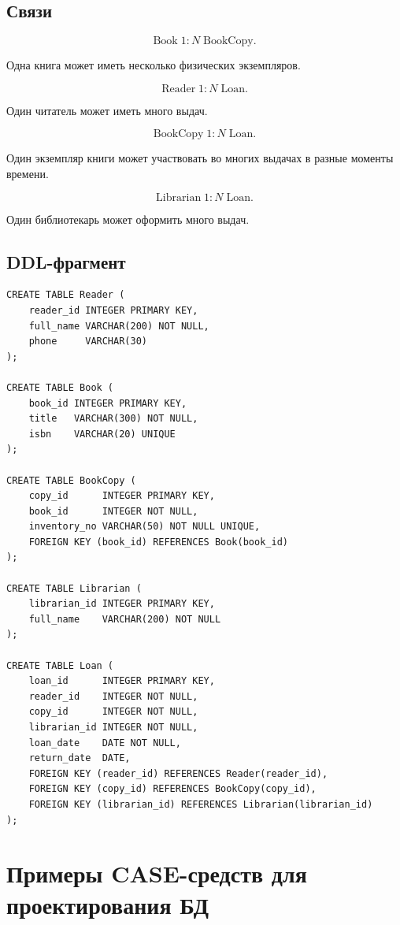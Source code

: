 \documentclass[12pt,a4paper]{article}
\theoremstyle{remark}
\begin{document}
\subsection{Связи}

\[
    \text{Book} \; 1 : N \; \text{BookCopy}.
\]

Одна книга может иметь несколько физических экземпляров.

\[
    \text{Reader} \; 1 : N \; \text{Loan}.
\]

Один читатель может иметь много выдач.

\[
    \text{BookCopy} \; 1 : N \; \text{Loan}.
\]

Один экземпляр книги может участвовать во многих выдачах в разные моменты времени.

\[
    \text{Librarian} \; 1 : N \; \text{Loan}.
\]

Один библиотекарь может оформить много выдач.

\subsection{DDL-фрагмент}

\begin{verbatim}
CREATE TABLE Reader (
    reader_id INTEGER PRIMARY KEY,
    full_name VARCHAR(200) NOT NULL,
    phone     VARCHAR(30)
);

CREATE TABLE Book (
    book_id INTEGER PRIMARY KEY,
    title   VARCHAR(300) NOT NULL,
    isbn    VARCHAR(20) UNIQUE
);

CREATE TABLE BookCopy (
    copy_id      INTEGER PRIMARY KEY,
    book_id      INTEGER NOT NULL,
    inventory_no VARCHAR(50) NOT NULL UNIQUE,
    FOREIGN KEY (book_id) REFERENCES Book(book_id)
);

CREATE TABLE Librarian (
    librarian_id INTEGER PRIMARY KEY,
    full_name    VARCHAR(200) NOT NULL
);

CREATE TABLE Loan (
    loan_id      INTEGER PRIMARY KEY,
    reader_id    INTEGER NOT NULL,
    copy_id      INTEGER NOT NULL,
    librarian_id INTEGER NOT NULL,
    loan_date    DATE NOT NULL,
    return_date  DATE,
    FOREIGN KEY (reader_id) REFERENCES Reader(reader_id),
    FOREIGN KEY (copy_id) REFERENCES BookCopy(copy_id),
    FOREIGN KEY (librarian_id) REFERENCES Librarian(librarian_id)
);
\end{verbatim}

\section{Примеры CASE-средств для проектирования БД}
\end{document}
